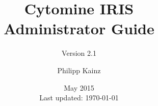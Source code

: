 \documentclass[
a4paper,
11pt,
oneside,
headsepline
]{scrbook}
\def\appVersion{2.1}
\begin{document}
\begin{titlepage}

\end{titlepage}

\frontmatter

\subject{Interobserver Reliability Study Module}
\title{Cytomine IRIS\\Administrator Guide}
\subtitle{Version \appVersion}
\author{Philipp Kainz}
\date{May 2015\\{\small Last updated: \today}}
\maketitle


\newpage
{
\hypersetup{linkcolor=black}
\noptcrule
\doparttoc[n] 
\tableofcontents
}
\mainmatter





\end{document}
